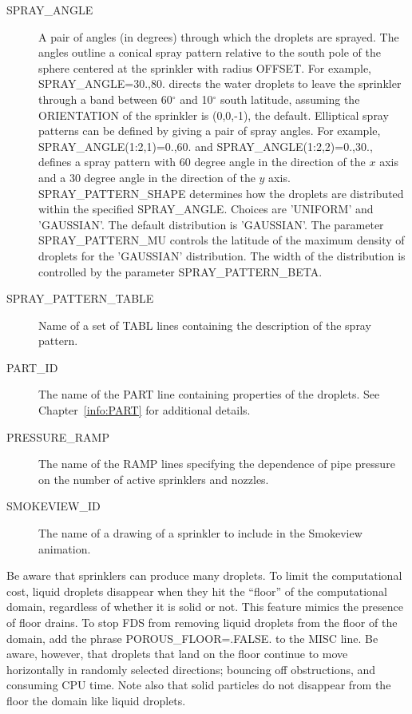\documentclass[11pt]{book}
\begin{document}
\begin{description}
\item[{\ct SPRAY\_ANGLE}] A pair of angles (in degrees) through which the droplets are sprayed. The angles outline a conical spray pattern relative to the south pole of the sphere centered at the sprinkler with radius {\ct OFFSET}. For example, {\ct SPRAY\_ANGLE=30.,80.} directs the water droplets to leave the sprinkler through a band between 60$^\circ$ and 10$^\circ$ south latitude, assuming the {\ct ORIENTATION} of the sprinkler is (0,0,-1), the default. Elliptical spray patterns can be defined by giving a pair of spray angles. For example, {\ct SPRAY\_ANGLE(1:2,1)=0.,60.}  and {\ct SPRAY\_ANGLE(1:2,2)=0.,30.}, defines a spray pattern with 60 degree angle in the direction of the $x$ axis and a 30 degree angle in the direction of the $y$ axis. {\ct SPRAY\_PATTERN\_SHAPE} determines how the droplets are distributed within the specified {\ct SPRAY\_ANGLE}. Choices are {\ct 'UNIFORM'} and {\ct 'GAUSSIAN'}. The default distribution is {\ct 'GAUSSIAN'}. The parameter {\ct SPRAY\_PATTERN\_MU} controls the latitude of the maximum density of droplets for the {\ct 'GAUSSIAN'} distribution. The width of the distribution is controlled by the parameter {\ct SPRAY\_PATTERN\_BETA}.
\item[{\ct SPRAY\_PATTERN\_TABLE}] Name of a set of {\ct TABL} lines containing the description of the spray pattern.
\item[{\ct PART\_ID}] The name of the {\ct PART} line containing properties of the droplets. See Chapter~\ref{info:PART} for additional details.
\item[{\ct PRESSURE\_RAMP}] The name of the {\ct RAMP} lines specifying the dependence of pipe pressure on the number of active sprinklers and nozzles.
\item[{\ct SMOKEVIEW\_ID}] The name of a drawing of a sprinkler to include in the Smokeview animation.
\end{description}
Be aware that sprinklers can produce many droplets. To limit the computational cost, liquid droplets disappear when they hit the ``floor'' of the computational domain, regardless of whether it is solid or not. This feature mimics the presence of floor drains. To stop FDS from removing liquid droplets from the floor of the domain, add the phrase {\ct POROUS\_FLOOR=.FALSE.} to the {\ct MISC} line. Be aware, however, that droplets that land on the floor continue to move horizontally in randomly selected directions; bouncing off obstructions, and consuming CPU time. Note also that solid particles do not disappear from the floor the domain like liquid droplets.
\end{document}
